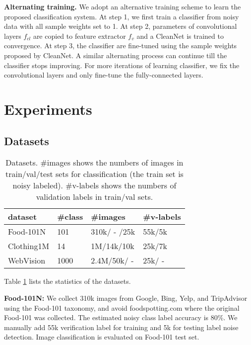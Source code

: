 \documentclass[10pt,twocolumn,letterpaper]{article}
\begin{document}
\noindent
\textbf{Alternating training.}
We adopt an alternative training scheme to learn the proposed classification system. At step 1, we first train a classifier from noisy data with all sample weights set to 1. At step 2, parameters of convolutional layers  $f_{cl}$ are copied to feature extractor $f_v$ and a CleanNet is trained to convergence. At step 3, the classifier are fine-tuned using the sample weights proposed by CleanNet. A similar alternating process can continue till the classifier stops improving. For more iterations of learning classifier, we fix the convolutional layers and only fine-tune the fully-connected layers.

\section{Experiments}
\subsection{Datasets}
\label{subsec:datasets}

\begin{table}
\begin{center}
\small
\begin{tabular}{|l|l|l|l|}
\hline
dataset & \#class & \#images & \#v-labels \\
\hline\hline
Food-101N & 101 & 310k/ - /25k & 55k/5k \\
Clothing1M & 14 & 1M/14k/10k & 25k/7k \\
WebVision & 1000 & 2.4M/50k/ - & 25k/ - \\
\hline
\end{tabular}
\end{center}
\caption{Datasets. \#images shows the numbers of images in train/val/test sets for classification (the train set is noisy labeled). \#v-labels shows the numbers of validation labels in train/val sets. }
\label{tb:datasets}
\end{table}

Table \ref{tb:datasets} lists the statistics of the datasets.

\noindent
\textbf{Food-101N:} We collect 310k images from Google, Bing, Yelp, and TripAdvisor using the Food-101 \cite{bossard2014food} taxonomy, and avoid foodspotting.com where the original Food-101 was collected. The estimated noisy class label accuracy is 80\%. We manually add 55k verification label for training and 5k for testing label noise detection. Image classification is evaluated on Food-101 test set.
\end{document}
